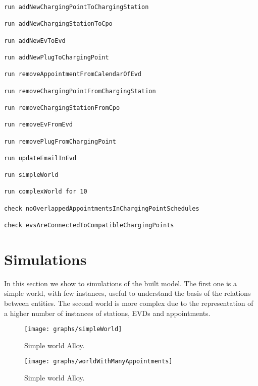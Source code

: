\begin{lstlisting}[language=alloy]
run addNewChargingPointToChargingStation

run addNewChargingStationToCpo

run addNewEvToEvd

run addNewPlugToChargingPoint

run removeAppointmentFromCalendarOfEvd

run removeChargingPointFromChargingStation

run removeChargingStationFromCpo

run removeEvFromEvd

run removePlugFromChargingPoint

run updateEmailInEvd

run simpleWorld

run complexWorld for 10

check noOverlappedAppointmentsInChargingPointSchedules

check evsAreConnectedToCompatibleChargingPoints

\end{lstlisting}

\section{Simulations}
\label{sec: sim}%
In this section we show to simulations of the built model.
The first one is a simple world, with few instances, useful to understand the basis of the relations between entities.
The second world is more complex due to the representation of a higher number of instances of stations, EVDs and appointments.

\begin{sidewaysfigure}
	\begin{figure} [H]
		\begin{center}
			\texttt{[image: graphs/simpleWorld]}
			\caption{Simple world Alloy.}
			\label{fig: simple_world_alloy}
		\end{center}
	\end{figure}
\end{sidewaysfigure}

\begin{sidewaysfigure}
	\begin{figure} [H]
		\begin{center}
			\texttt{[image: graphs/worldWithManyAppointments]}
			\caption{Simple world Alloy.}
			\label{fig: many_appointments_world_alloy}
		\end{center}
	\end{figure}
\end{sidewaysfigure}
